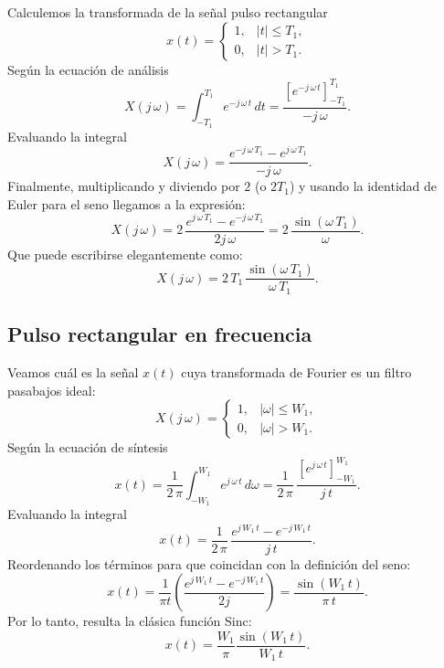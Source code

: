 \documentclass[11pt,a4paper,openany]{book}
\begin{document}
Calculemos la transformada de la señal pulso rectangular 
\begin{equation}
	x(t) = \begin{cases}
		1, & |t| \leq T_{1}, \\ 
		0, & |t| > T_{1}.
	\end{cases}
\end{equation}
Según la ecuación de análisis 
\begin{equation}
	X(j \, \omega) = \int_{-T_{1}}^{T_{1}} e^{-j \, \omega \, t} \, dt = \frac{\left[e^{-j \, \omega \, t}\right]_{-T_{1}}^{T_{1}}}{-j \, \omega}.
\end{equation}
Evaluando la integral
\begin{equation}
	X(j \, \omega) = \frac{e^{-j \, \omega \, T_{1}} - e^{j \, \omega \, T_{1}}}{-j \, \omega}.
\end{equation}
Finalmente, multiplicando y diviendo por $2$ (o $2T_1$) y usando la identidad de Euler para el seno llegamos a la expresión:
\begin{equation}
	X(j \, \omega) = 2 \, \frac{e^{j \, \omega \, T_{1}} - e^{-j \, \omega \, T_{1}}}{2j \, \omega} = 2 \, \frac{\sin(\omega \, T_{1})}{\omega}.
\end{equation}
Que puede escribirse elegantemente como:
\begin{equation}
	X(j \, \omega) = 2 \, T_{1} \, \frac{\sin(\omega \, T_{1})}{\omega \, T_{1}}.
\end{equation}

\subsection{Pulso rectangular en frecuencia}

Veamos cuál es la señal $x(t)$ cuya transformada de Fourier es un filtro pasabajos ideal:
\begin{equation}
	X(j \, \omega) = \begin{cases}
		1, & |\omega| \leq W_{1}, \\ 
		0, & |\omega| > W_{1}.
	\end{cases}
\end{equation}
Según la ecuación de síntesis 
\begin{equation}
	x(t) = \frac{1}{2 \, \pi} \int_{-W_{1}}^{W_{1}} e^{j \, \omega \, t} \, d\omega = \frac{1}{2 \, \pi} \, \frac{\left[e^{j \, \omega \, t}\right]_{-W_{1}}^{W_{1}}}{j \, t}.
\end{equation}
Evaluando la integral
\begin{equation}
	x(t) = \frac{1}{2 \, \pi} \, \frac{e^{j \, W_{1} \, t} - e^{-j \, W_{1} \, t}}{j \, t}.
\end{equation}
Reordenando los términos para que coincidan con la definición del seno:
\begin{equation}
	x(t) = \frac{1}{\pi t} \left( \frac{e^{j \, W_{1} \, t} - e^{-j \, W_{1} \, t}}{2j} \right) = \frac{\sin(W_{1} \, t)}{\pi \, t}.
\end{equation}
Por lo tanto, resulta la clásica función Sinc:
\begin{equation}
	x(t) = \frac{W_{1}}{\pi} \frac{\sin(W_{1} \, t)}{W_{1} \, t}.
\end{equation}
\end{document}
